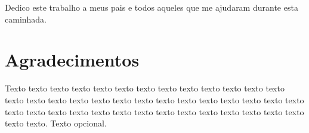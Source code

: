 

\begin{dedicatoria}
    Dedico este trabalho a meus pais e todos aqueles que me ajudaram durante esta caminhada.
\end{dedicatoria}


\chapter*{Agradecimentos}

Texto texto texto texto texto texto texto texto texto texto texto texto texto
texto texto texto texto texto texto texto texto texto texto texto texto texto
texto texto texto texto texto texto texto texto texto texto texto texto texto
texto texto texto texto. Texto opcional.

\printResumoAbstract



\makeatletter
\if@openright\cleardoublepage\else\clearpage\fi
\makeatother


